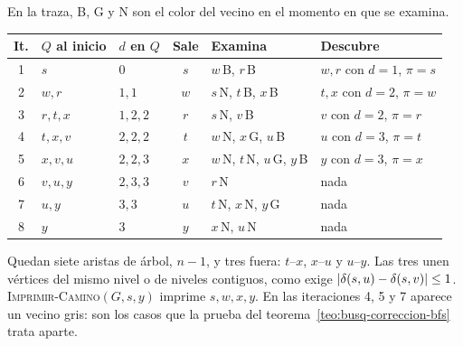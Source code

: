 \documentclass[11pt,letterpaper]{article}
\begin{document}
\begin{ejemplo}
\begin{center}
\begin{tikzpicture}[x=1.05cm, y=1.05cm,
      cajaCola/.style={draw=gray!70, fill=gray!15, font=\scriptsize,
                       minimum size=0.42cm, inner sep=0pt}]
  \end{tikzpicture}
  \end{center}
  En la traza, B, G y N son el color del vecino en el momento en que
  se examina.
  \begin{center}
  \small
  \begin{tabular}{cllcll}
    \toprule
    \textbf{It.} & \textbf{$Q$ al inicio} & \textbf{$d$ en $Q$}
      & \textbf{Sale} & \textbf{Examina} & \textbf{Descubre} \\
    \midrule
    1 & $s$ & $0$ & $s$ & $w$\,B, $r$\,B
      & $w, r$ con $d = 1$, $\pi = s$ \\
    2 & $w, r$ & $1, 1$ & $w$ & $s$\,N, $t$\,B, $x$\,B
      & $t, x$ con $d = 2$, $\pi = w$ \\
    3 & $r, t, x$ & $1, 2, 2$ & $r$ & $s$\,N, $v$\,B
      & $v$ con $d = 2$, $\pi = r$ \\
    4 & $t, x, v$ & $2, 2, 2$ & $t$ & $w$\,N, $x$\,G, $u$\,B
      & $u$ con $d = 3$, $\pi = t$ \\
    5 & $x, v, u$ & $2, 2, 3$ & $x$ & $w$\,N, $t$\,N, $u$\,G, $y$\,B
      & $y$ con $d = 3$, $\pi = x$ \\
    6 & $v, u, y$ & $2, 3, 3$ & $v$ & $r$\,N & nada \\
    7 & $u, y$ & $3, 3$ & $u$ & $t$\,N, $x$\,N, $y$\,G & nada \\
    8 & $y$ & $3$ & $y$ & $x$\,N, $u$\,N & nada \\
    \bottomrule
  \end{tabular}
  \end{center}
  Quedan siete aristas de árbol, $n - 1$, y tres fuera: $t$--$x$,
  $x$--$u$ y $u$--$y$. Las tres unen vértices del mismo nivel o de
  niveles contiguos, como exige
  $\left\lvert \delta(s, u) - \delta(s, v) \right\rvert \leq 1$.
  \textsc{Imprimir-Camino}$(G, s, y)$ imprime $s, w, x, y$. En las
  iteraciones 4, 5 y 7 aparece un vecino gris: son los casos que la
  prueba del teorema~\ref{teo:busq-correccion-bfs} trata aparte.
\end{ejemplo}
\end{document}
